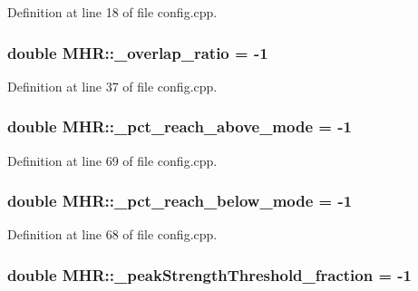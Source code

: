 Definition at line 18 of file config.\+cpp.

\hypertarget{namespace_m_h_r_aed0501a3045731a781439b11ee82fbfe}{
\subsubsection[{\+\_\+overlap\+\_\+ratio}]{\setlength{\rightskip}{0pt plus 5cm}double M\+H\+R\+::\+\_\+overlap\+\_\+ratio = -\/1}}\label{namespace_m_h_r_aed0501a3045731a781439b11ee82fbfe}


Definition at line 37 of file config.\+cpp.

\hypertarget{namespace_m_h_r_a3b2e38d795c8389fd066cefa0af2ef47}{
\subsubsection[{\+\_\+pct\+\_\+reach\+\_\+above\+\_\+mode}]{\setlength{\rightskip}{0pt plus 5cm}double M\+H\+R\+::\+\_\+pct\+\_\+reach\+\_\+above\+\_\+mode = -\/1}}\label{namespace_m_h_r_a3b2e38d795c8389fd066cefa0af2ef47}


Definition at line 69 of file config.\+cpp.

\hypertarget{namespace_m_h_r_acb8b09915d13e40eba7f00718c40ce6a}{
\subsubsection[{\+\_\+pct\+\_\+reach\+\_\+below\+\_\+mode}]{\setlength{\rightskip}{0pt plus 5cm}double M\+H\+R\+::\+\_\+pct\+\_\+reach\+\_\+below\+\_\+mode = -\/1}}\label{namespace_m_h_r_acb8b09915d13e40eba7f00718c40ce6a}


Definition at line 68 of file config.\+cpp.

\hypertarget{namespace_m_h_r_a8a80b7897b02d4d2a57311a344df8497}{
\subsubsection[{\+\_\+peak\+Strength\+Threshold\+\_\+fraction}]{\setlength{\rightskip}{0pt plus 5cm}double M\+H\+R\+::\+\_\+peak\+Strength\+Threshold\+\_\+fraction = -\/1}}\label{namespace_m_h_r_a8a80b7897b02d4d2a57311a344df8497}


